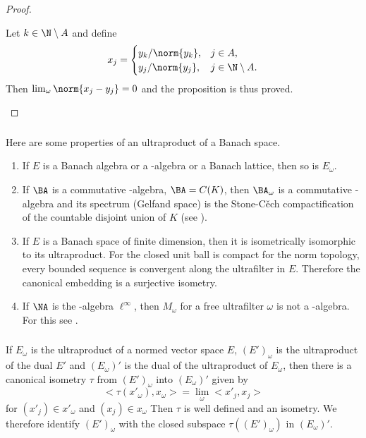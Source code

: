 \documentclass[%
	,english 
	,headings	= small 
	,leqno
	,parskip		= half+
	,DIV			= 14
	,BCOR 			= 10mm	
		]{scrartcl}
\begin{document}
\begin{multicols}{2}
\begin{proof}
\begin{enumerate}[\upshape (i), wide, labelindent=.5em]
Let $ k \in \N \setminus A $ and define
%
\[
    x_{ j } = 
    	\begin{cases}
    		y_{ k }/\norm{ 	y_{ k } }  ,  	& j \in A  ,  \\
    		y_{ j }/\norm{ 	y_{ j } }  ,  	& j \in \N \setminus A  . 
    	\end{cases}
\]
%
Then $ \lim_{ \omega } \norm{ x_{ j } - y_{ j } } = 0 $ and the proposition is thus proved.

\end{enumerate}
\end{proof}
%
\subsubsection{}
Here are some properties of an ultraproduct of a Banach space.
%
\begin{examples}
\begin{enumerate}[\upshape (i), wide, labelindent=.5em]

	\item
	If $ E $ is a Banach algebra or a \CA-algebra or a Banach lattice, then so is $ E_{ \omega } $.
	
	\item
	If $ \BA $ is a commutative \CA-algebra, \ie $ \BA = C(K) $, then $ \BA_{ \omega } $ is a commutative \CA-algebra and its spectrum (Gelfand space) is the Stone-C\v{e}ch compactification of the countable disjoint union of $ K $ (see \textcite[Theorem 4.1]{heinrich:1980}).
%	
	\item
	If $ E $ is a Banach space of finite dimension, then it is isometrically isomorphic to its ultraproduct. 
	For the closed unit ball is compact for the norm topology, \ie every bounded sequence is convergent along the ultrafilter in $ E $.
	Therefore the canonical embedding is a surjective isometry.
	
	\item
	If $ \NA $ is the \WA-algebra $ \ell^{ \infty } $, then $ M_{ \omega } $ for a free ultrafilter $ \omega $ is not a \WA-algebra.
	For this see \textcite[p. 79]{heinrich:1980}.
\end{enumerate}	

\end{examples}
\subsubsection{}
If $ E_{ \omega } $ is the ultraproduct of a normed vector space $ E $, $ (E')_{ \omega } $ is the ultraproduct of the dual $ E' $ and $ ( E_{ \omega } ){}' $ is the dual of the ultraproduct of $ E_{ \omega } $, then there is a canonical isometry $ \tau $ from $ (E')_{ \omega } $ into $ ( E_{ \omega } ){}' $ given by
%
\[
    < \tau( x'_{ \omega } ), x_{ \omega } > 	= \lim_{ \omega }   < x'_{ j } , x_{ j } >
\]
%
for $ ( x'_{ j } ) \in x'_{ \omega }  $ and $ ( x_{ j } ) \in x_{ \omega } $
Then $ \tau $ is well defined and an isometry.
We therefore identify $ (E')_{ \omega } $ with the closed subspace $ \tau( (E')_{ \omega } ) $ in 
$ ( E_{ \omega } ){}' $.


\end{multicols}
\end{document}
